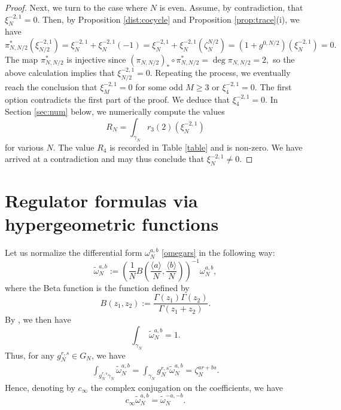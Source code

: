 \documentclass[11pt,a4,leqno]{amsart}
\theoremstyle{my theoremstyle}
\theoremstyle{dfn}
\theoremstyle{remark}
\renewcommand{\1}{\mathbbm{1}}
\numberwithin{equation}{section}
\begin{document}
\begin{proof}
    Next, we turn to the case where $N$ is even. 
    Assume, by contradiction, that $\xi_N^{-2,1}=0$. Then, by Proposition \ref{dist:cocycle} and Proposition \ref{prop:trace}(i), we have 
    \[
    \pi_{N,N/2}^* (\xi_{N/2}^{-2,1}) = \xi_N^{-2,1}+\xi_N^{-2,1}(-1) = \xi_N^{-2,1}+\xi_N^{-2,1}(\zeta_N^{N/2})= (1+g^{0,N/2}) (\xi_N^{-2,1}) = 0.
    \]
    The map $\pi^*_{N, N/2}$ is injective since 
    $(\pi_{N, N/2})_* \circ \pi^*_{N, N/2}= \deg{\pi_{N, N/2}= 2},$ so the above calculation implies that $\xi_{N/2}^{-2,1}=0$. Repeating the process, we eventually reach the conclusion that $\xi_{M}^{-2,1}=0$ for some odd $M\geq 3$ or $\xi_{4}^{-2,1}=0$. The first option contradicts the first part of the proof. We deduce that $\xi_{4}^{-2,1}=0$. In Section \ref{sec:num} below, we numerically compute the values
    \[
    R_N = \int_{\gamma_N} r_3(2)(\xi_N^{-2,1})
    \]
    for various $N$. The value $R_4$ is recorded in Table \ref{table} and is non-zero. We have arrived at a contradiction and may thus conclude that $\xi_N^{-2,1}\neq 0$.
\end{proof}

\section{Regulator formulas via hypergeometric functions}\label{s:hyperg}

Let us normalize the differential form $\omega_N^{a, b}$ \eqref{omegars} in the following way:
\begin{equation*}
\widetilde{\omega}_N^{a, b}:= \left(\frac1N B\left(\frac{\langle a \rangle}N, \frac{\langle b \rangle}N \right) \right)^{-1} \omega_N^{a, b},
\end{equation*}
where the Beta function is the function defined by
\[
B(z_1,z_2):=\frac{\Gamma(z_1)\Gamma(z_2)}{\Gamma(z_1+z_2)}.
\]
By \cite[Proposition 4.9]{Ots11}, we then have
\begin{equation}\label{eq:normint}
     \int_{\gamma_N} \tilde\omega_N^{a,b}=1.
\end{equation}
Thus, for any $g_N^{r, s} \in G_N$, we have
\begin{align*}
\int_{g_N^{r, s} \gamma_N} \widetilde{\omega}_N^{a, b} = \int_{\gamma_N} g_N^{r, s} \widetilde{\omega}_N^{a, b}  = \zeta_N^{ar+bs}. 
\end{align*}
Hence, denoting by $c_{\infty}$ the complex conjugation on the coefficients, we have 
$$c_{\infty} \widetilde{\omega}_N^{a, b} = \widetilde{\omega}_N^{-a, -b}. $$
\end{document}
